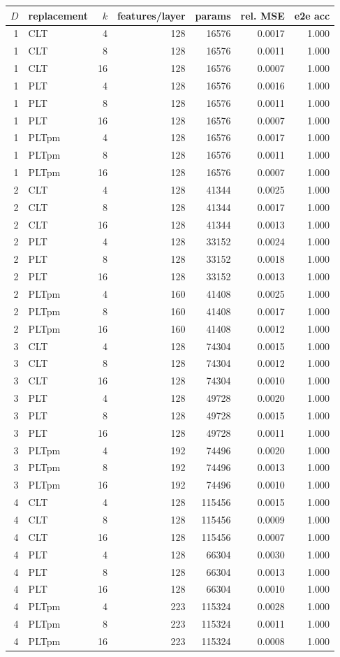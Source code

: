 \begin{tabular}{rlrrrrr}\toprule
$D$ & replacement & $k$ & features/layer & params & rel. MSE & e2e acc\\\midrule
1 & CLT & 4 & 128 & 16576 & 0.0017 & 1.000\\
1 & CLT & 8 & 128 & 16576 & 0.0011 & 1.000\\
1 & CLT & 16 & 128 & 16576 & 0.0007 & 1.000\\
1 & PLT & 4 & 128 & 16576 & 0.0016 & 1.000\\
1 & PLT & 8 & 128 & 16576 & 0.0011 & 1.000\\
1 & PLT & 16 & 128 & 16576 & 0.0007 & 1.000\\
1 & PLTpm & 4 & 128 & 16576 & 0.0017 & 1.000\\
1 & PLTpm & 8 & 128 & 16576 & 0.0011 & 1.000\\
1 & PLTpm & 16 & 128 & 16576 & 0.0007 & 1.000\\
2 & CLT & 4 & 128 & 41344 & 0.0025 & 1.000\\
2 & CLT & 8 & 128 & 41344 & 0.0017 & 1.000\\
2 & CLT & 16 & 128 & 41344 & 0.0013 & 1.000\\
2 & PLT & 4 & 128 & 33152 & 0.0024 & 1.000\\
2 & PLT & 8 & 128 & 33152 & 0.0018 & 1.000\\
2 & PLT & 16 & 128 & 33152 & 0.0013 & 1.000\\
2 & PLTpm & 4 & 160 & 41408 & 0.0025 & 1.000\\
2 & PLTpm & 8 & 160 & 41408 & 0.0017 & 1.000\\
2 & PLTpm & 16 & 160 & 41408 & 0.0012 & 1.000\\
3 & CLT & 4 & 128 & 74304 & 0.0015 & 1.000\\
3 & CLT & 8 & 128 & 74304 & 0.0012 & 1.000\\
3 & CLT & 16 & 128 & 74304 & 0.0010 & 1.000\\
3 & PLT & 4 & 128 & 49728 & 0.0020 & 1.000\\
3 & PLT & 8 & 128 & 49728 & 0.0015 & 1.000\\
3 & PLT & 16 & 128 & 49728 & 0.0011 & 1.000\\
3 & PLTpm & 4 & 192 & 74496 & 0.0020 & 1.000\\
3 & PLTpm & 8 & 192 & 74496 & 0.0013 & 1.000\\
3 & PLTpm & 16 & 192 & 74496 & 0.0010 & 1.000\\
4 & CLT & 4 & 128 & 115456 & 0.0015 & 1.000\\
4 & CLT & 8 & 128 & 115456 & 0.0009 & 1.000\\
4 & CLT & 16 & 128 & 115456 & 0.0007 & 1.000\\
4 & PLT & 4 & 128 & 66304 & 0.0030 & 1.000\\
4 & PLT & 8 & 128 & 66304 & 0.0013 & 1.000\\
4 & PLT & 16 & 128 & 66304 & 0.0010 & 1.000\\
4 & PLTpm & 4 & 223 & 115324 & 0.0028 & 1.000\\
4 & PLTpm & 8 & 223 & 115324 & 0.0011 & 1.000\\
4 & PLTpm & 16 & 223 & 115324 & 0.0008 & 1.000\\
\bottomrule\end{tabular}

